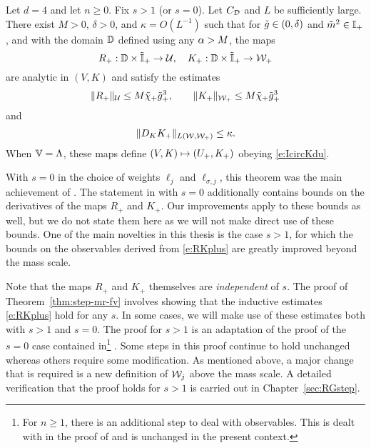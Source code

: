 \begin{theorem}
\label{thm:step-mr-fv}
Let $d = 4$ and let $n \ge 0$. Fix $s > 1$ (or $s = 0$). Let $C_{\mathcal{D}}$ and $L$
be sufficiently large. There exist $M>0$, $\delta >0$,
and $\kappa = O(L^{-1})$											%
such that for $\tilde{g} \in (0,\delta)$
and $\tilde{m}^2 \in \mathbb{I}_+$,											%
and with the domain $\mathbb{D}$ defined using any $\alpha> M$, the maps
\begin{equation}
\label{e:RKplusmaps}
R_+:\domRG \times \Igen_+ %
	\to \Ucal,
		\quad
K_+:\domRG \times \Igen_+ %
	\to \Wcal_{+}%
\end{equation}
are analytic in $(V, K)$											%
and satisfy the estimates
\begin{equation}
\label{e:RKplus}
\|R_+\|_{\mathcal{U}}
	\le
M\tilde{\chi}_+\tilde{g}_+^{3},
	\qquad
\|K_+\|_{\mathcal{W}_+}
	\le
M\tilde{\chi}_+ \tilde{g}_+^{3}
\end{equation}
and
\begin{equation}
\label{e:DKkappa}
\|D_K K_+\|_{L(\mathcal{W},\mathcal{W}_+)} \le \kappa.
\end{equation}
When $\mathbb{V} = \Lambda$, these maps define $(V,K)\mapsto (U_+,K_+)$
obeying \eqref{e:IcircKdu}.
\end{theorem}

With $s = 0$ in the choice of weights $\ell_j$ and $\ell_{\sigma,j}$,
this theorem was the main achievement of \cite{BS-rg-step}.
The statement in \cite{BS-rg-step} with $s = 0$ additionally contains
bounds on the derivatives of the maps $R_+$ and $K_+$. Our improvements
apply to these bounds as well, but we do not state them here as we will
not make direct use of these bounds.
One of the main novelties in this thesis is the case $s > 1$,
for which the bounds on the observables derived from \eqref{e:RKplus}
are greatly improved beyond the mass scale.

Note that the maps $R_+$ and $K_+$ themselves are \emph{independent} of $s$.
The proof of Theorem~\ref{thm:step-mr-fv} involves showing that the
inductive estimates \eqref{e:RKplus} hold for any $s$. In some cases,
we will make use of these estimates both with $s > 1$ and $s = 0$.
The proof for $s > 1$ is an adaptation of the proof of the $s = 0$ case contained
in\footnote{For $n \ge 1$, there is an additional step to deal with observables.
This is dealt with in the proof of \cite[Theorem~\ref{phi4-thm:step-mr-fv}]{ST-phi4}
and is unchanged in the present context.}
\cite{BS-rg-IE,BS-rg-step}.
Some steps in this proof continue to hold unchanged whereas others require
some modification. As mentioned above, a major change that is required is
a new definition of $\mathcal{W}_j$ above the mass scale. A detailed verification
that the proof holds for $s > 1$ is carried out in Chapter~\ref{sec:RGstep}.

